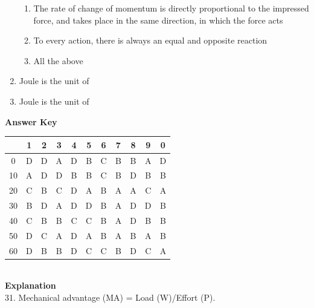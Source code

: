 \documentclass[11pt,a4paper]{article}
\begin{document}
\begin{enumerate}
\begin{enumerate}[label=\Alph*.]
\item{The rate of change of momentum is directly proportional to the impressed force, and takes place in the same direction, in which the force acts}
\item{To every action, there is always an equal and opposite reaction}
\item{All the above}
\end{enumerate}
\item{Joule is the unit of}
\\
\item{Joule is the unit of}
\\
\end{enumerate}
\textbf{Answer Key}
\begin{tabular}{ | c | c c c c c c c c c c | }
\hline
 & 1 & 2 & 3 & 4 & 5 & 6 & 7 & 8 & 9 & 0 \\
\hline
0 & D & D & A & D & B & C & B & B & A & D \\
10 & A & D & D & B & B & C & B & D & B & B \\
20 & C & B & C & D & A & B & A & A & C & A \\
30 & B & D & A & D & D & B & A & D & D & B \\
40 & C & B & B & C & C & B & A & D & B & B \\
50 & D & C & A & D & A & B & A & B & A & B \\
60 & D & B & B & D & C & C & B & D & C & A \\
\hline
\end{tabular}
\\\textbf{Explanation}\\
31.
Mechanical advantage (MA) = Load (W)/Effort (P).
\clearpage
\end{document}
